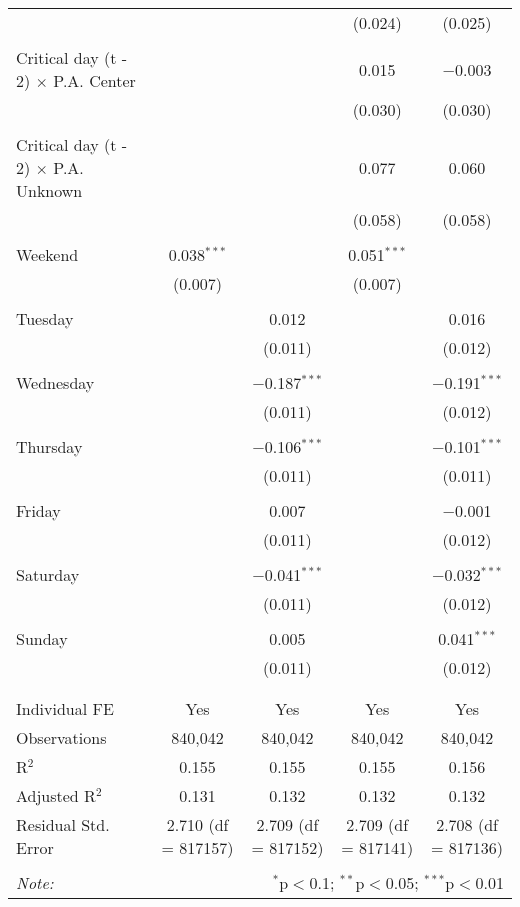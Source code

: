 \documentclass[
]{article}
\begin{document}
\begin{table}[!htbp]
{\begin{tabular}{@{\extracolsep{5pt}}lcccc}
  &  &  & (0.024) & (0.025) \\ 
  & & & & \\ 
 Critical day (t - 2) $\times$ P.A. Center &  &  & 0.015 & $-$0.003 \\ 
  &  &  & (0.030) & (0.030) \\ 
  & & & & \\ 
 Critical day (t - 2) $\times$ P.A. Unknown &  &  & 0.077 & 0.060 \\ 
  &  &  & (0.058) & (0.058) \\ 
  & & & & \\ 
 Weekend & 0.038$^{***}$ &  & 0.051$^{***}$ &  \\ 
  & (0.007) &  & (0.007) &  \\ 
  & & & & \\ 
 Tuesday &  & 0.012 &  & 0.016 \\ 
  &  & (0.011) &  & (0.012) \\ 
  & & & & \\ 
 Wednesday &  & $-$0.187$^{***}$ &  & $-$0.191$^{***}$ \\ 
  &  & (0.011) &  & (0.012) \\ 
  & & & & \\ 
 Thursday &  & $-$0.106$^{***}$ &  & $-$0.101$^{***}$ \\ 
  &  & (0.011) &  & (0.011) \\ 
  & & & & \\ 
 Friday &  & 0.007 &  & $-$0.001 \\ 
  &  & (0.011) &  & (0.012) \\ 
  & & & & \\ 
 Saturday &  & $-$0.041$^{***}$ &  & $-$0.032$^{***}$ \\ 
  &  & (0.011) &  & (0.012) \\ 
  & & & & \\ 
 Sunday &  & 0.005 &  & 0.041$^{***}$ \\ 
  &  & (0.011) &  & (0.012) \\ 
  & & & & \\ 
\hline \\[-1.8ex] 
Individual FE & Yes & Yes & Yes & Yes \\ 
Observations & 840,042 & 840,042 & 840,042 & 840,042 \\ 
R$^{2}$ & 0.155 & 0.155 & 0.155 & 0.156 \\ 
Adjusted R$^{2}$ & 0.131 & 0.132 & 0.132 & 0.132 \\ 
Residual Std. Error & 2.710 (df = 817157) & 2.709 (df = 817152) & 2.709 (df = 817141) & 2.708 (df = 817136) \\ 
\hline 
\hline \\[-1.8ex] 
\textit{Note:}  & \multicolumn{4}{r}{$^{*}$p$<$0.1; $^{**}$p$<$0.05; $^{***}$p$<$0.01} \\ 
\end{tabular}
} 
\end{table}
\end{document}
